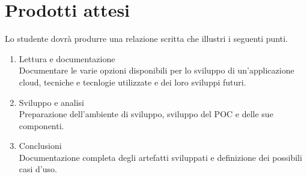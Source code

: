 \section*{Prodotti attesi}
Lo studente dovrà produrre una relazione scritta che illustri i seguenti punti.
\begin{enumerate}
    \item Lettura e documentazione \\
     Documentare le varie opzioni disponibili per lo sviluppo di un'applicazione cloud, tecniche e tecnlogie utilizzate e dei loro sviluppi futuri.
    
    \item Sviluppo e analisi \\
    Preparazione dell'ambiente di sviluppo, sviluppo del POC e delle sue componenti.

    
    \item Conclusioni \\
    Documentazione completa degli artefatti sviluppati e definizione dei possibili casi d'uso.
\end{enumerate}


